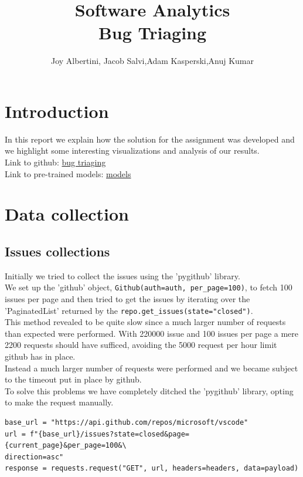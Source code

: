 \documentclass[tikz,10pt,fleqn]{article}
\title{\textbf{Software Analytics\\Bug Triaging}}
\author{Joy Albertini, Jacob Salvi,Adam Kasperski,Anuj Kumar}
\date{}
\begin{document}
\maketitle

\section*{Introduction}
In this report we explain how the solution for the assignment was developed and we highlight some interesting visualizations and analysis of our results.\\
Link to github: \href{https://github.com/JacobSalvi/software-analytics-bug-triaging}{bug triaging}\\
Link to pre-trained models: \href{https://usi365-my.sharepoint.com/:u:/g/personal/alberj_usi_ch/ETIADAeiFuZMpq4sqEEyNdMBL69uAv7qzqJbgXMEkZxUDw?e=zUUBDH}{models}

\section*{Data collection}
\subsection*{Issues collections}
Initially we tried to collect the issues using the 'pygithub' library.\\
We set up the 'github' object, \texttt{Github(auth=auth, per_page=100)}, to fetch 100 issues per page and then tried to get the issues by iterating over the 'PaginatedList' returned by the \texttt{repo.get_issues(state="closed")}.\\
This method revealed to be quite slow since a much larger number of requests than expected were performed. With 220000 issue and 100 issues per page a mere 2200 requests should have sufficed, avoiding the 5000 request per hour limit github has in place.\\
Instead a much larger number of requests were performed and we became subject to the timeout put in place by github. \\
To solve this problems we have completely ditched the 'pygithub' library, opting to make the request manually.

\begin{verbatim}
base_url = "https://api.github.com/repos/microsoft/vscode"
url = f"{base_url}/issues?state=closed&page={current_page}&per_page=100&\
direction=asc"
response = requests.request("GET", url, headers=headers, data=payload)
\end{verbatim}
\end{document}
